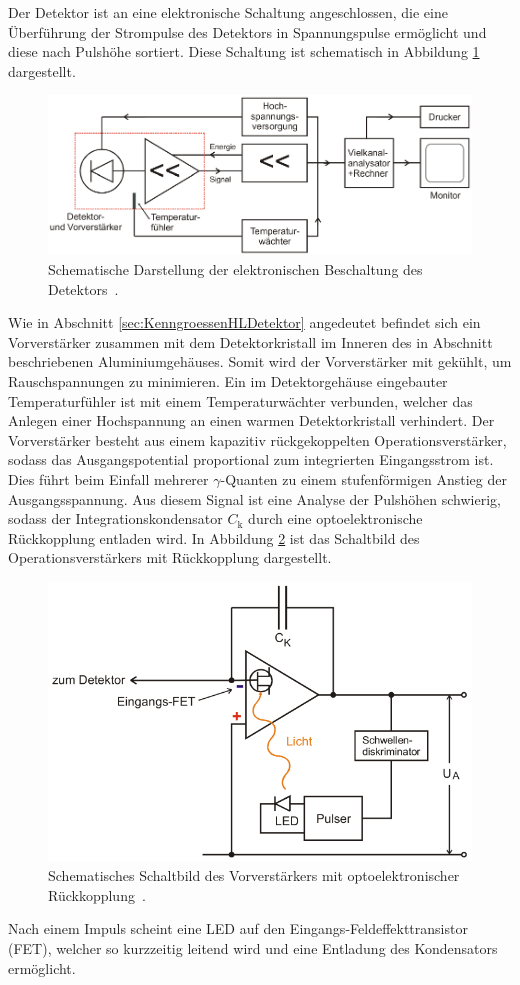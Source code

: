 Der Detektor ist an eine elektronische Schaltung angeschlossen, die eine Überführung
der Strompulse des Detektors in Spannungspulse ermöglicht und diese nach Pulshöhe sortiert.
Diese Schaltung ist schematisch in Abbildung \ref{fig:Gesamtschaltbild} dargestellt.
\begin{figure}
	\centering
	\includegraphics[width=.9\textwidth]{images/Gesamtschaltbild.pdf}
	\caption{Schematische Darstellung der elektronischen Beschaltung des Detektors~\cite[22]{anleitung}.}
	\label{fig:Gesamtschaltbild}
\end{figure}
Wie in Abschnitt \ref{sec:KenngroessenHLDetektor} angedeutet befindet sich ein Vorverstärker
zusammen mit dem Detektorkristall im Inneren des in Abschnitt \label{sec:AufbauDetektor}
beschriebenen Aluminiumgehäuses.
Somit wird der Vorverstärker mit gekühlt, um Rauschspannungen zu minimieren.
Ein im Detektorgehäuse eingebauter Temperaturfühler ist mit einem Temperaturwächter verbunden,
welcher das Anlegen einer Hochspannung an einen warmen Detektorkristall verhindert.
Der Vorverstärker besteht aus einem kapazitiv rückgekoppelten Operationsverstärker, sodass
das Ausgangspotential proportional zum integrierten Eingangsstrom ist.
Dies führt beim Einfall mehrerer $\gamma$-Quanten zu einem stufenförmigen Anstieg der Ausgangsspannung.
Aus diesem Signal ist eine Analyse der Pulshöhen schwierig,
sodass der Integrationskondensator $C_\text{k}$ durch eine optoelektronische Rückkopplung
entladen wird. In Abbildung \ref{fig:Optoelektronische-Rueckkopplung} ist das Schaltbild
des Operationsverstärkers mit Rückkopplung dargestellt.
\begin{figure}
	\centering
	\includegraphics[width=.7\textwidth]{images/Optoelektronische-Rueckkopplung.pdf}
	\caption{Schematisches Schaltbild des Vorverstärkers mit optoelektronischer Rückkopplung~\cite[19]{anleitung}.}
	\label{fig:Optoelektronische-Rueckkopplung}
\end{figure}
Nach einem Impuls scheint eine LED auf den Eingangs-Feldeffekttransistor (FET), welcher so kurzzeitig
leitend wird und eine Entladung des Kondensators ermöglicht.

